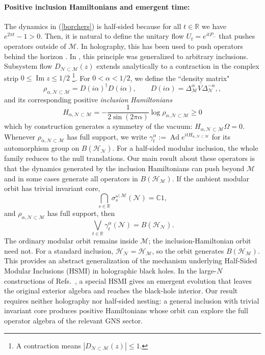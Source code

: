 \documentclass[a4paper,11pt]{article}
\theoremstyle{definition}
\newcommand{\mN}{\mathcal{N}}
\newcommand{\mH}{\mathcal{H}}
\newcommand{\mM}{\mathcal{M}}
\begin{document}
\paragraph{Positive inclusion Hamiltonians and emergent time:} The dynamics in (\ref{borchers}) is half-sided because for all $t\in\mathbb{R}$ we have $e^{2\pi t}-1>0$. Then, it is natural to define the unitary flow $U_t=e^{i t P_-}$ that pushes operators outside of $\mM$. In holography, this has been used to push operators behind the horizon \cite{LeutheusserLiuCausal}. In \cite{chen2026local}, this principle was generalized to arbitrary inclusions. Subsystem flow $D_{\mN\subset\mM}(z)$ extends analytically to a contraction in the complex strip $0\leq\operatorname{Im}z\leq1/2$ \footnote{A contraction means $|D_{\mN\subset\mM}(z)|\leq 1$.}.
For $0<\alpha<1/2$, we define the ``density matrix"
\begin{equation}
\rho_{\alpha,\mN\subset\mM}=D(i\alpha)^\dagger D(i\alpha),\qquad    D(i\alpha)
    =
    \overline{\Delta_{\mM}^\alpha V\Delta_{\mN}^{-\alpha}},
    ,
\end{equation}
and its corresponding positive {\it inclusion Hamiltonians} 
\begin{equation}
    H_{\alpha,\mN\subset\mM}
    =
    -\frac{1}{2\sin(2\pi\alpha)}
    \log\rho_{\alpha,\mN\subset\mM}\geq 0
    \label{eq:intro-Halpha}
\end{equation}
which by construction generates a symmetry of the vacuum:
$H_{\alpha,\mN\subset\mM}\Omega=0$.
Whenever $\rho_{\alpha,\mN\subset\mM}$ has full support, we write
$\gamma_t^\alpha:=\operatorname{Ad}e^{itH_{\alpha,\mN\subset\mM}}$
for its automorphism group on $B(\mH_{\mN})$.
For a half-sided modular inclusion, the whole family reduces to the null translations.
Our main result about these operators is that the dynamics generated by the inclusion Hamiltonians can push beyond $\mM$ and in some cases generate all operators in $B(\mH_{\mM})$.  If the ambient modular orbit has trivial invariant core,
\begin{equation}
    \bigcap_{s\in\mathbb R}
    \sigma_s^{\omega;\mM}(\mN)
    =
    \mathbb C1,
\end{equation}
and $\rho_{\alpha,\mN\subset\mM}$ has full support, then
\begin{equation}
    \bigvee_{t\in\mathbb R}
    \gamma_t^\alpha(\mN)
    =
    B(\mH_{\mN}).
    \label{eq:intro-full-generation}
\end{equation}
The ordinary modular orbit remains inside $\mM$; the inclusion-Hamiltonian orbit need not.  For a standard inclusion, $\mH_{\mN}=\mH_{\mM}$, so the orbit generates $B(\mH_{\mM})$. This provides an abstract generalization of the mechanism underlying Half-Sided Modular Inclusions (HSMI) in holographic black holes.  In the large-$N$ constructions of Refs.~\cite{LeutheusserLiuCausal,LeutheusserLiu2023,LeutheusserLiuSubregion}, a special HSMI gives an emergent evolution that leaves the original exterior algebra and reaches the black-hole interior.  Our result requires neither holography nor half-sided nesting: a general inclusion with trivial invariant core produces positive Hamiltonians whose orbit can explore the full operator algebra of the relevant GNS sector.  
\end{document}
